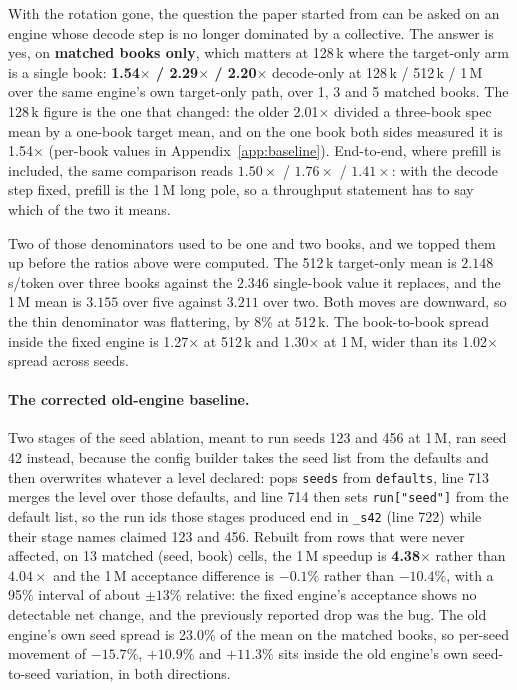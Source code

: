 \documentclass{article}
\begin{document}
With the rotation gone, the question the paper started from can be asked on an engine whose
decode step is no longer dominated by a collective. The answer is yes, on
\textbf{matched books only}, which matters at 128\,k where the target-only arm is a single
book:
\textbf{1.54$\times$ / 2.29$\times$ / 2.20$\times$} decode-only at 128\,k / 512\,k / 1\,M over
the same engine's own target-only path, over 1, 3 and 5 matched books. The 128\,k figure is
the one that changed: the older 2.01$\times$ divided a three-book spec mean by a one-book
target mean, and on the one book both sides measured it is 1.54$\times$ (per-book values in
Appendix~\ref{app:baseline}). End-to-end, where prefill is included, the same comparison reads
$1.50\times$ / $1.76\times$ / $1.41\times$: with the decode step fixed, prefill is the 1\,M
long pole, so a throughput statement has to say which of the two it means.


Two of those denominators used to be one and two books, and we topped them up before the
ratios above were computed. The 512\,k target-only mean is $2.148$\,s/token over three books
against the $2.346$ single-book value it replaces, and the 1\,M mean is $3.155$ over five
against $3.211$ over two. Both moves are downward, so the thin denominator was flattering, by
$8\%$ at 512\,k. The book-to-book spread inside the fixed
engine is 1.27$\times$ at 512\,k and 1.30$\times$ at 1\,M, wider than its 1.02$\times$ spread
across seeds.

\paragraph{The corrected old-engine baseline.} Two stages of the seed ablation, meant to run
seeds 123 and 456 at 1\,M, ran seed 42 instead, because the config builder takes the seed list
from the defaults and then overwrites whatever a level declared:
 pops \texttt{seeds} from \texttt{defaults}, line 713 merges the
level over those defaults, and line 714 then sets \texttt{run["seed"]} from the default list,
so the run ids those stages produced end in \texttt{\_s42} (line 722) while their stage names
claimed 123 and 456. Rebuilt from rows that were never affected, on 13 matched (seed, book)
cells, the 1\,M speedup is \textbf{4.38$\times$} rather than $4.04\times$ and the 1\,M
acceptance difference is \textbf{$-0.1\%$} rather than $-10.4\%$, with a 95\% interval of
about $\pm13\%$ relative: the fixed engine's acceptance shows no detectable net change, and
the previously reported drop was the bug. The old engine's
own seed spread is 23.0\% of the mean on the matched books, so per-seed movement of
$-15.7\%$, $+10.9\%$ and $+11.3\%$ sits inside the old engine's own seed-to-seed variation, in
both directions.
\end{document}
